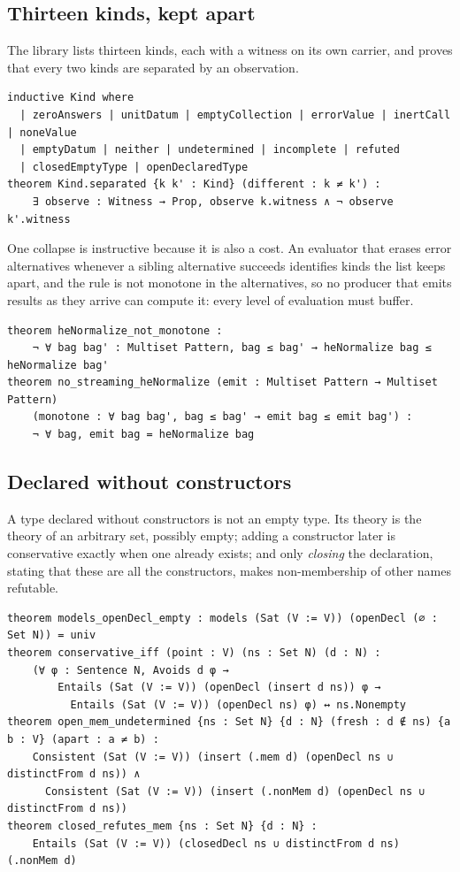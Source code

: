 \documentclass[11pt]{article}
\theoremstyle{plain}
\theoremstyle{definition}
\begin{document}
\subsection{Thirteen kinds, kept apart}

The library lists thirteen kinds, each with a witness on its own carrier, and proves that
every two kinds are separated by an observation.

\begin{lstlisting}
inductive Kind where
  | zeroAnswers | unitDatum | emptyCollection | errorValue | inertCall | noneValue
  | emptyDatum | neither | undetermined | incomplete | refuted
  | closedEmptyType | openDeclaredType
theorem Kind.separated {k k' : Kind} (different : k ≠ k') :
    ∃ observe : Witness → Prop, observe k.witness ∧ ¬ observe k'.witness
\end{lstlisting}

\noindent One collapse is instructive because it is also a cost. An evaluator that erases
error alternatives whenever a sibling alternative succeeds identifies kinds the list keeps
apart, and the rule is not monotone in the alternatives, so no producer that emits results as
they arrive can compute it: every level of evaluation must buffer.

\begin{lstlisting}
theorem heNormalize_not_monotone :
    ¬ ∀ bag bag' : Multiset Pattern, bag ≤ bag' → heNormalize bag ≤ heNormalize bag'
theorem no_streaming_heNormalize (emit : Multiset Pattern → Multiset Pattern)
    (monotone : ∀ bag bag', bag ≤ bag' → emit bag ≤ emit bag') :
    ¬ ∀ bag, emit bag = heNormalize bag
\end{lstlisting}

\subsection{Declared without constructors}

A type declared without constructors is not an empty type. Its theory is the theory of an
arbitrary set, possibly empty; adding a constructor later is conservative exactly when one
already exists; and only \emph{closing} the declaration, stating that these are all the
constructors, makes non-membership of other names refutable.

\begin{lstlisting}
theorem models_openDecl_empty : models (Sat (V := V)) (openDecl (∅ : Set N)) = univ
theorem conservative_iff (point : V) (ns : Set N) (d : N) :
    (∀ φ : Sentence N, Avoids d φ →
        Entails (Sat (V := V)) (openDecl (insert d ns)) φ →
          Entails (Sat (V := V)) (openDecl ns) φ) ↔ ns.Nonempty
theorem open_mem_undetermined {ns : Set N} {d : N} (fresh : d ∉ ns) {a b : V} (apart : a ≠ b) :
    Consistent (Sat (V := V)) (insert (.mem d) (openDecl ns ∪ distinctFrom d ns)) ∧
      Consistent (Sat (V := V)) (insert (.nonMem d) (openDecl ns ∪ distinctFrom d ns))
theorem closed_refutes_mem {ns : Set N} {d : N} :
    Entails (Sat (V := V)) (closedDecl ns ∪ distinctFrom d ns) (.nonMem d)
\end{lstlisting}
\end{document}
